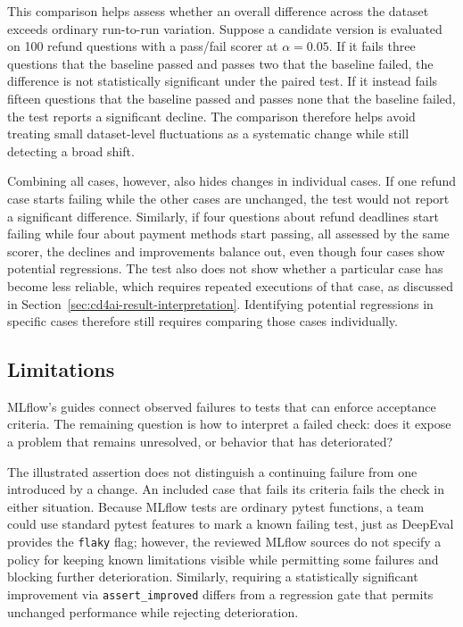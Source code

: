 This comparison helps assess whether an overall difference across the dataset
exceeds ordinary run-to-run variation. Suppose a candidate version is
evaluated on 100 refund questions with a pass/fail scorer at $\alpha = 0.05$.
If it fails three questions that the baseline passed and passes two that the
baseline failed, the difference is not statistically significant under the
paired test. If it instead fails fifteen questions that the baseline passed and
passes none that the baseline failed, the test reports a significant decline.
The comparison therefore helps avoid treating small dataset-level fluctuations
as a systematic change while still detecting a broad shift.

Combining all cases, however, also hides changes in individual cases. If one
refund case starts failing while the other cases are unchanged, the test would
not report a significant difference. Similarly, if four questions about refund
deadlines start failing while four about payment methods start passing, all
assessed by the same scorer, the declines and improvements balance out, even
though four cases show potential regressions. The test also does not show
whether a particular case has become less reliable, which requires repeated
executions of that case, as discussed in
Section~\ref{sec:cd4ai-result-interpretation}. Identifying potential
regressions in specific cases therefore still requires comparing those cases
individually.

\subsection{Limitations}

MLflow's guides connect observed failures to tests that can enforce acceptance
criteria. The remaining question is how to interpret a failed check: does it
expose a problem that remains unresolved, or behavior that has deteriorated?

The illustrated assertion does not distinguish a continuing failure from one
introduced by a change. An included case that fails its criteria fails the
check in either situation. Because MLflow tests are ordinary pytest functions,
a team could use standard pytest features to mark a known failing test, just as
DeepEval provides the \texttt{flaky} flag; however, the reviewed MLflow sources
do not specify a policy for keeping known limitations visible while permitting
some failures and blocking further deterioration. Similarly, requiring a
statistically significant improvement via \texttt{assert\_improved} differs
from a regression gate that permits unchanged performance while rejecting
deterioration.

